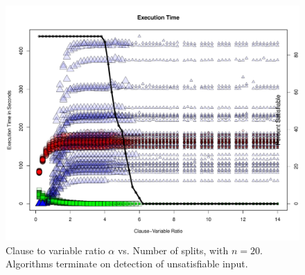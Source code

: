 \begin{figure}[htdp]

\begin{center}

\includegraphics[width=1.1\textwidth]{./figures/metricOutput_n20-earlyExit/executionTime.pdf}

\caption{Clause to variable ratio $\alpha$ vs. Number of splits, with $n = 20$.  Algorithms terminate on detection of unsatisfiable input. }
\label{timeFig_10}
\end{center}
\end{figure}

\FloatBarrier
			

